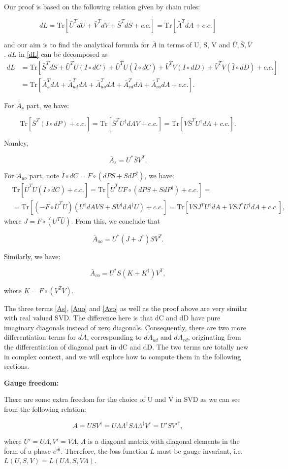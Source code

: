 \documentclass[aps,prl,singlecolumn,preprintnumbers,amsmath,amssymb,notitlepage]{revtex4-1}
\def\Tr{\mathrm{Tr}}
\newcommand{\<}{\langle}
\renewcommand{\>}{\rangle}
\newcommand{\al}[1]{\begin{align}#1\end{align}}
\newcommand{\eq}[2]{
	\begin{equation}
	#1 \label{#2}
	\end{equation}
}
\begin{document}
Our proof is based on the following relation given by chain rules:
\eq{dL=\Tr[\bar{U}^TdU+\bar{V}^TdV+\bar{S}^TdS+c.c.]=\Tr[\bar{A}^TdA +c.c.]}{dL} 
and our aim is to find the analytical formula for $\bar{A}$ in terms of U, S, V and $\bar{U}, \bar{S}, \bar{V}$. $dL$ in \eqref{dL} can be decomposed as
\begin{align}
	dL&=\Tr[\bar{S}^TdS+\bar{U}^TU(I\circ dC)+\bar{U}^TU(\bar{I}\circ dC)+\bar{V}^TV(I\circ dD)+\bar{V}^TV(\bar{I}\circ dD)+c.c.]\\
	&=\Tr[\bar{A}^T_{s}dA+\bar{A}^T_{ud}dA+\bar{A}^T_{uo}dA+\bar{A}^T_{vd}dA+\bar{A}^T_{vo}dA+c.c.].
\end{align}

For $\bar{A}_s$ part, we have:
\eq{\Tr[\bar{S}^T (I\circ dP)+c.c.]=\Tr[\bar{S}^T U^\dagger dA V+c.c.]=\Tr[V\bar{S}^TU^\dagger dA+c.c.].}{arg2}
Namley, 
\eq{\bar{A}_s=U^*\bar{S}V^T.}{As}

For $\bar{A}_{uo}$ part, note $\bar{I}\circ dC=F\circ (dP S+SdP^\dagger)$, we have:
\al{&\Tr[\bar{U}^TU(\bar{I}\circ dC)+c.c.]=\Tr[\bar{U}^T U F\circ (dP S+ S dP^\dagger)+c.c.]=\\
&	=\Tr[(-F\circ \bar{U}^TU)(U^\dagger dA VS +SV^\dagger dA^\dagger U)+c.c.]=\Tr[VSJ^TU^\dagger dA+V SJ^* U^\dagger dA+c.c.]
	,}
where $J=F\circ (U^T\bar{U})$. From this, we conclude that
\eq{\bar{A}_{uo}=U^* (J+J^\dagger)SV^T.}{Auo}

Similarly, we have:
\eq{\bar{A}_{vo}=U^* S (K+K^\dagger)V^T,}{Avo}
where $K=F\circ (V^T\bar{V})$.

The three terms \eqref{As}, \eqref{Auo} and \eqref{Avo} as well as the proof above are very similar with real valued SVD. The difference here is that dC and dD have pure imaginary diagonals instead of zero diagonals. Consequently, there are two more differentiation terms for $dA$, corresponding to $dA_{ud}$ and $dA_{vd}$, originating from the differentiation of diagonal part in dC and dD. The two terms are totally new in complex context, and we will explore how to compute them in the following sections.


{\bf Gauge freedom:}

There are some extra freedom for the choice of U and V in SVD as we can see from the following relation:
\eq{A=USV^\dagger=U\Lambda \Lambda^\dagger S\Lambda \Lambda^\dagger V^\dagger=U'SV'^\dagger ,}{gauge}
where $U'=U\Lambda, V'=V\Lambda$, $\Lambda$ is a diagonal matrix with diagonal elements in the form of a phase  $e^{i\theta}$. Therefore, the loss function $L$ must be gauge invariant, i.e. $L(U, S, V)=L(U\Lambda, S, V\Lambda)$. 
\end{document}
